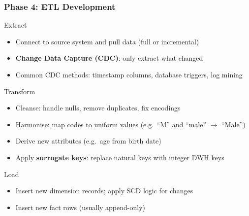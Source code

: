\begin{frame}
  \frametitle{Phase 4: ETL Development}

  \begin{block}{Extract}
    \begin{itemize}
      \item Connect to source system and pull data (full or incremental)
      \item \textbf{Change Data Capture (CDC)}: only extract what changed
      \item Common CDC methods: timestamp columns, database triggers, log mining
    \end{itemize}
  \end{block}

  \begin{block}{Transform}
    \begin{itemize}
      \item Cleanse: handle nulls, remove duplicates, fix encodings
      \item Harmonise: map codes to uniform values (e.g.\ ``M'' and ``male'' $\to$ ``Male'')
      \item Derive new attributes (e.g.\ age from birth date)
      \item Apply \textbf{surrogate keys}: replace natural keys with integer DWH keys
    \end{itemize}
  \end{block}

  \begin{block}{Load}
    \begin{itemize}
      \item Insert new dimension records; apply SCD logic for changes
      \item Insert new fact rows (usually append-only)
    \end{itemize}
  \end{block}

\end{frame}

